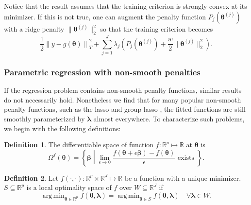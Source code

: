 \documentclass[12pt]{article} %
\theoremstyle{definition}
\newtheorem{definition}{Definition}
\DeclareMathOperator*{\argmin}{arg\,min}
\begin{document}
Notice that the result assumes that the training criterion is strongly convex at its minimizer. If this is not true, one can augment the penalty function $P_j(\boldsymbol{\theta}^{(j)})$ with a ridge penalty $\| \boldsymbol{\theta}^{(j)} \|_2^2$ so that the training criterion becomes
\begin{equation}
\label{eq:param_add_models_ridge}
\frac{1}{2} \left  \| y -  g(\boldsymbol{\theta}) \right \|^2_T 
+ \sum_{j=1}^J \lambda_j \left ( P_j(\boldsymbol{\theta}^{(j)}) + \frac{w}{2} \| \boldsymbol{\theta}^{(j)} \|^2_2 \right ).
\end{equation}

\subsubsection{Parametric regression with non-smooth penalties}
\label{sec:param_nonsmooth}

If the regression problem contains non-smooth penalty functions, similar results do not necessarily hold. Nonetheless we find that for many popular non-smooth penalty functions, such as the lasso \citep{tibshirani1996regression} and group lasso \citep{yuan2006model}, the fitted functions are still smoothly parameterized by $\boldsymbol \lambda$ almost everywhere. To characterize such problems, we begin with the following definitions:

\begin{definition}
	The differentiable space of function $f:\mathbb{R}^p \mapsto \mathbb{R}$ at $\boldsymbol{\theta}$ is
	\begin{equation}
	\Omega^{f}(\boldsymbol{\theta}) = \left \{ \boldsymbol{\beta} \middle | \lim_{\epsilon \rightarrow 0} \frac{f(\boldsymbol{\theta} + \epsilon \boldsymbol{\beta}) - f(\boldsymbol{\theta})}{\epsilon} \text{ exists } \right \}.
	\end{equation}
\end{definition}

\begin{definition}
	Let $f(\cdot, \cdot): \mathbb{R}^p \times \mathbb{R}^J \mapsto \mathbb{R}$ be a function with a unique minimizer.
	$S \subseteq \mathbb{R}^p$ is a local optimality space of $f$ over $W \subseteq \mathbb{R}^J$ if
	\begin{equation}
	\argmin_{\boldsymbol{\theta} \in \mathbb{R}^p} f(\boldsymbol{\theta}, \boldsymbol \lambda) =
	\argmin_{\boldsymbol{\theta} \in S} f(\boldsymbol{\theta}, \boldsymbol \lambda) \quad \forall \boldsymbol \lambda \in W.
	\end{equation}
\end{definition}
\end{document}
